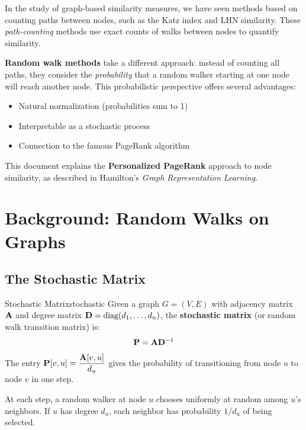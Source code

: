 \begin{notechapter}
In the study of graph-based similarity measures, we have seen methods based on counting paths between nodes, such as the Katz index and LHN similarity. These \emph{path-counting} methods use exact counts of walks between nodes to quantify similarity.

\textbf{Random walk methods} take a different approach: instead of counting all paths, they consider the \emph{probability} that a random walker starting at one node will reach another node. This probabilistic perspective offers several advantages:
\begin{itemize}
    \item Natural normalization (probabilities sum to 1)
    \item Interpretable as a stochastic process
    \item Connection to the famous PageRank algorithm
\end{itemize}

This document explains the \textbf{Personalized PageRank} approach to node similarity, as described in Hamilton's \emph{Graph Representation Learning}.

\section{Background: Random Walks on Graphs}

\subsection{The Stochastic Matrix}

\begin{definition}{Stochastic Matrix}{stochastic}
Given a graph $G = (V, E)$ with adjacency matrix $\mathbf{A}$ and degree matrix $\mathbf{D} = \text{diag}(d_1, \ldots, d_n)$, the \textbf{stochastic matrix} (or random walk transition matrix) is:
\begin{equation}
\mathbf{P} = \mathbf{A} \mathbf{D}^{-1}
\label{random-walk-similarity:eq:stochastic}
\end{equation}
The entry $\mathbf{P}[v, u] = \dfrac{\mathbf{A}[v,u]}{d_u}$ gives the probability of transitioning from node $u$ to node $v$ in one step.
\end{definition}

\begin{intuition}
At each step, a random walker at node $u$ chooses uniformly at random among $u$'s neighbors. If $u$ has degree $d_u$, each neighbor has probability $1/d_u$ of being selected.


\end{intuition}
\end{notechapter}

